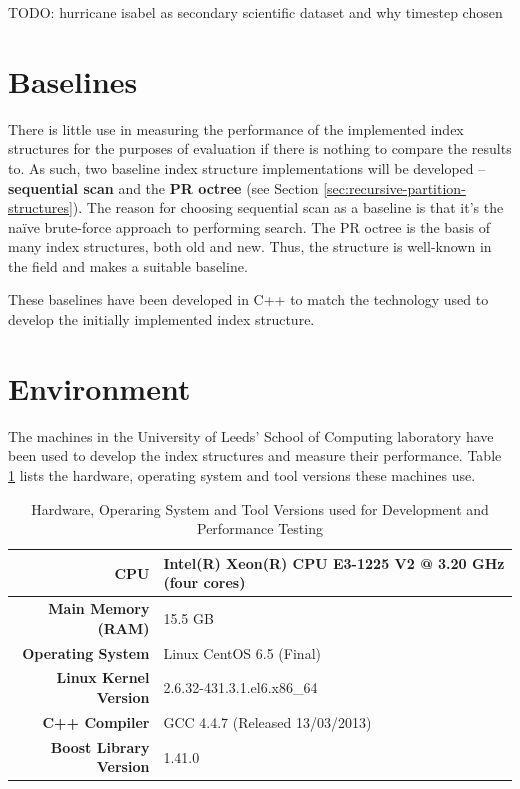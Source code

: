 TODO: hurricane isabel as secondary scientific dataset and why timestep chosen

\section{Baselines}
\label{sec:baselines}

There is little use in measuring the performance of the implemented index structures for the purposes of evaluation if there is nothing to compare the results to. As such, two baseline index structure implementations will be developed -- \textbf{sequential scan} and the \textbf{PR octree} (see Section \ref{sec:recursive-partition-structures}). The reason for choosing sequential scan as a baseline is that it's the na\"{i}ve brute-force approach to performing search. The PR octree is the basis of many index structures, both old and new. Thus, the structure is well-known in the field and makes a suitable baseline.

These baselines have been developed in C++ to match the technology used to develop the initially implemented index structure.

\section{Environment}

The machines in the University of Leeds' School of Computing laboratory have been used to develop the index structures and measure their performance. Table \ref{tab:system-specifications} lists the hardware, operating system and tool versions these machines use.

\begin{table}
	\centering
	\begin{tabular}{|r|l|}
		\hline
		\textbf{CPU} & Intel(R) Xeon(R) CPU E3-1225 V2 @ 3.20 GHz (four cores) \\
		\hline
		\textbf{Main Memory (RAM)} & 15.5 GB \\
		\hline
		\textbf{Operating System} & Linux CentOS 6.5 (Final) \\
		\hline
		\textbf{Linux Kernel Version} & 2.6.32-431.3.1.el6.x86\_64 \\
		\hline
		\textbf{C++ Compiler} & GCC 4.4.7 (Released 13/03/2013) \\
		\hline
		\textbf{Boost Library Version} & 1.41.0 \\
		\hline
	\end{tabular}
	\caption{Hardware, Operaring System and Tool Versions used for Development and Performance Testing}
	\label{tab:system-specifications}
\end{table}

